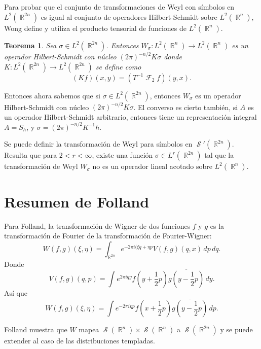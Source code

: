 \documentclass[a4paper]{report}
\DeclareMathOperator{\R}{\mathbb{R}}
\DeclareMathOperator{\Sz}{\mathcal S}
\DeclareMathOperator{\F}{\mathcal{F}}
\newtheorem{theorem}{Teorema}
\begin{document}
  Para probar que el conjunto de transformaciones de Weyl
  con símbolos en $L^2(\R^{2n})$ es igual al conjunto de
  operadores Hilbert-Schmidt sobre $L^2(\R^{n})$, Wong
  define y utiliza el producto tensorial de funciones de
  $L^2(\R^{n})$.

  \begin{theorem}
    Sea $\sigma \in L^2(\R^{2n})$. Entonces $W_\sigma :
    L^2(\R^{n}) \to L^2(\R^{n})$ es un operador
    Hilbert-Schmidt con núcleo $(2\pi)^{-n / 2}K \sigma$
    donde $K : L^2(\R^{2n}) \to L^2(\R^{2n})$ se define como
    \[
      (Kf)(x,y)
      = (T^{-1}\F_2 f)(y,x).
    \] 
  \end{theorem}

  Entonces ahora sabemos que si $\sigma \in L^2(\R^{2n})$,
  entonces $W_\sigma$ es un operador Hilbert-Schmidt con
  núcleo $(2\pi)^{-n / 2} K \sigma$. El converso es cierto
  también, si $A$ es un operador Hilbert-Schmidt arbitrario,
  entonces tiene un representación integral $A = S_h$, y
  $\sigma = (2\pi)^{-n / 2} K^{-1}h$.

  Se puede definir la transformación de Weyl para símbolos
  en $\Sz'(\R^{2n})$. Resulta que para $2 < r < \infty$,
  existe una función $\sigma \in L^{r}(\R^{2n})$ tal que la
  transformación de Weyl $W_\sigma$ no es un operador lineal
  acotado sobre $L^2(\R^{n})$.

  \section{Resumen de Folland}

  

  

  Para Folland, la transformación de Wigner de dos funciones
  $f$ y $g$ es la transformación de Fourier de la
  transformación de Fourier-Wigner:
  \[
    W(f,g)(\xi, \eta)
    = \int_{\R^{2n}} e^{-2\pi i (\xi q + \eta p} V(f,g)(q,x)
    \, dp \, dq.
  \] 
  Donde
  \[
    V(f,g)(q,p)
    = \int e^{2\pi i q y} f(y + \frac{1}{2}p)\overline{g(y -
    \frac{1}{2}p)} \, dy.
  \] 
  Así que
  \[
    W(f,g)(\xi, \eta) = \int e^{-2\pi i \eta p }
    f(x+\frac{1}{2}p)\overline{g(y-\frac{1}{2}p)} \, dp.
  \] 

  Folland muestra que $W$ mapea $\Sz(\R^{n}) \times
  \Sz(\R^{n})$ a $\Sz(\R^{2n})$ y se puede extender al caso
  de las distribuciones templadas.

  \newpage
  \printbibliography
\end{document}

